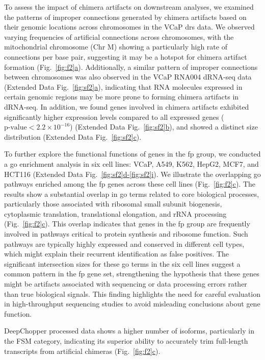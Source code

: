 \documentclass[pdflatex,sn-nature, lineno]{sn-jnl}%
\newcommand{\figref}[2]{Fig.~\hyperref[#1]{\ref*{#1}#2}}
\newcommand{\edfigref}[2]{Extended Data Fig.~\hyperref[#1]{\ref*{#1}#2}}
\newcommand{\edfigrefrg}[3]{Extended Data Fig.~\hyperref[#1]{\ref*{#1}#2-\ref*{#1}#3}}
\theoremstyle{thmstyleone}%
\theoremstyle{thmstyletwo}%
\theoremstyle{thmstylethree}%
\begin{document}
To assess the impact of chimera artifacts on downstream analyses, we examined the patterns of improper connections generated by chimera artifacts based on their genomic locations across chromosomes in the VCaP \gls{drs} data. We observed varying frequencies of artificial connections across chromosomes, with the mitochondrial chromosome (Chr M) showing a particularly high rate of connections per base pair, suggesting it may be a hotspot for chimera artifact formation (\figref{fig:f2}{a}). Additionally, a similar pattern of improper connections between chromosomes was also observed in the VCaP RNA004 dRNA-seq data (\edfigref{fig:sf2}{a}), indicating that RNA molecules expressed in certain genomic regions may be more prone to forming chimera artifacts in dRNA-seq. In addition, we found genes involved in chimera artifacts exhibited significantly higher expression levels compared to all expressed genes (\(\textrm{p-value} < 2.2 \times 10^{-16}\)) (\edfigref{fig:sf2}{b}), and showed a distinct size distribution (\edfigref{fig:sf2}{c}).

To further explore the functional functions of genes in the \gls{fp} group, we conducted a \gls{go} enrichment analysis in six cell lines: VCaP, A549, K562, HepG2, MCF7, and HCT116 (\edfigrefrg{fig:sf2}{d}{i}).
We illustrate the overlapping \gls{go} pathways enriched among the \gls{fp} genes across these cell lines (\figref{fig:f2}{c}).
The results show a substantial overlap in \gls{go} terms related to core biological processes, particularly those associated with ribosomal small subunit biogenesis, cytoplasmic translation, translational elongation, and rRNA processing (\figref{fig:f2}{c}).
This overlap indicates that genes in the \gls{fp} group are frequently involved in pathways critical to protein synthesis and ribosome function.
Such pathways are typically highly expressed and conserved in different cell types, which might explain their recurrent identification as false positives.
The significant intersection sizes for these \gls{go} terms in the six cell lines suggest a common pattern in the \gls{fp} gene set, strengthening the hypothesis that these genes might be artifacts associated with sequencing or data processing errors rather than true biological signals.
This finding highlights the need for careful evaluation in high-throughput sequencing studies to avoid misleading conclusions about gene function.

DeepChopper processed data shows a higher number of isoforms, particularly in the FSM category, indicating its superior ability to accurately trim full-length transcripts from artificial chimeras (\figref{fig:f2}{c}).
\end{document}
